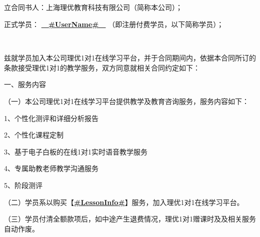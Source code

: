 \documentclass {ctexart}
\begin{document}
\setlength{\parskip}{0.7ex plus0.3ex minus0.3ex} %

\setcounter{page}{1} %
\headheight 14pt %


\pagestyle{fancy}

\fancyhf{}
\renewcommand{\headrulewidth}{0pt}
\fancyhead[LE,RO]{ \usebox{\headpic}   }      %




\subsection{}

立合同书人：上海理优教育科技有限公司（简称本公司）；


正式学员：   \underline{\textbf{　#UserName#　}} （即注册付费学员，以下简称学员）；

　

兹就学员加入本公司理优1对1在线学习平台，并于合同期间内，依据本合同所订的条款接受理优1对1的教学服务，双方同意就相关合同约定如下：


一、服务内容


（一）本公司理优1对1在线学习平台提供教学及教育咨询服务，服务内容如下：


1、个性化测评和详细分析报告	


2、个性化课程定制


3、基于电子白板的在线1对1实时语音教学服务	


4、专属助教老师教学沟通服务


5、阶段测评


（二）学员系以购买【\underline{\textbf{#LessonInfo#}}】服务，加入理优1对1在线学习平台。


（三）学员付清全额款项后，如中途产生退费情况，理优1对1赠课时及及相关服务自动作废。
\end{document}
